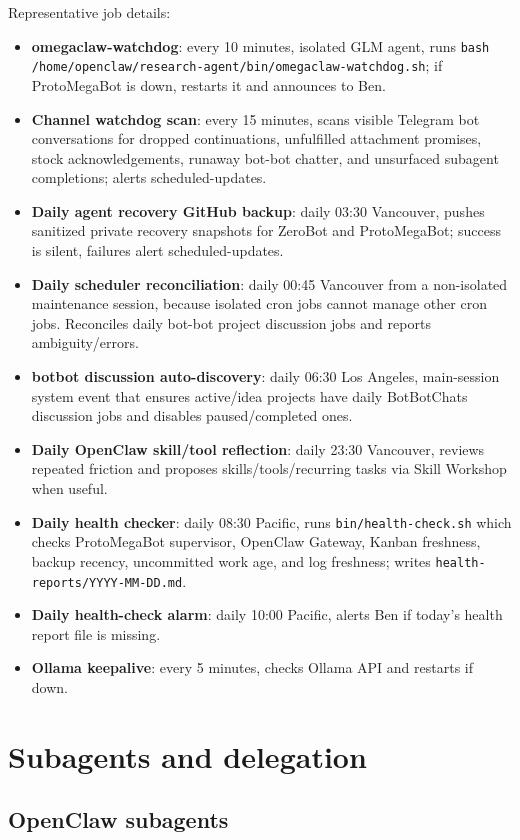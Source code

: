 \documentclass[11pt]{article}
\begin{document}
Representative job details:
\begin{itemize}
  \item \textbf{omegaclaw-watchdog}: every 10 minutes, isolated GLM agent, runs \texttt{bash /home/openclaw/research-agent/bin/omegaclaw-watchdog.sh}; if ProtoMegaBot is down, restarts it and announces to Ben.
  \item \textbf{Channel watchdog scan}: every 15 minutes, scans visible Telegram bot conversations for dropped continuations, unfulfilled attachment promises, stock acknowledgements, runaway bot-bot chatter, and unsurfaced subagent completions; alerts scheduled-updates.
  \item \textbf{Daily agent recovery GitHub backup}: daily 03:30 Vancouver, pushes sanitized private recovery snapshots for ZeroBot and ProtoMegaBot; success is silent, failures alert scheduled-updates.
  \item \textbf{Daily scheduler reconciliation}: daily 00:45 Vancouver from a non-isolated maintenance session, because isolated cron jobs cannot manage other cron jobs.  Reconciles daily bot-bot project discussion jobs and reports ambiguity/errors.
  \item \textbf{botbot discussion auto-discovery}: daily 06:30 Los Angeles, main-session system event that ensures active/idea projects have daily BotBotChats discussion jobs and disables paused/completed ones.
  \item \textbf{Daily OpenClaw skill/tool reflection}: daily 23:30 Vancouver, reviews repeated friction and proposes skills/tools/recurring tasks via Skill Workshop when useful.
  \item \textbf{Daily health checker}: daily 08:30 Pacific, runs \texttt{bin/health-check.sh} which checks ProtoMegaBot supervisor, OpenClaw Gateway, Kanban freshness, backup recency, uncommitted work age, and log freshness; writes \texttt{health-reports/YYYY-MM-DD.md}.
  \item \textbf{Daily health-check alarm}: daily 10:00 Pacific, alerts Ben if today's health report file is missing.
  \item \textbf{Ollama keepalive}: every 5 minutes, checks Ollama API and restarts if down.
\end{itemize}

\section{Subagents and delegation}

\subsection{OpenClaw subagents}
\end{document}
